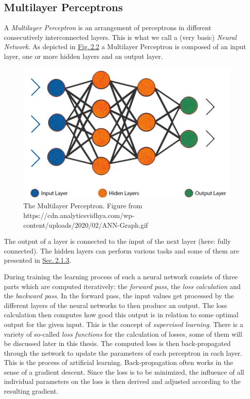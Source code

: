 \subsection{Multilayer Perceptrons} \label{sec:2.1.2}
A \textit{Multilayer Perceptron} is an arrangement of perceptrons in different consecutively interconnected layers. This is what we call a (very basic) \textit{Neural Network}. As depicted in \hyperref[fig:2.2]{Fig.\,2.2} a Multilayer Perceptron is composed of an input layer, one or more hidden layers and an output layer. 
%
\begin{figure} \label{fig:2.2}
    \centering
    \includegraphics[width=.5\textwidth]{Chapters/figures/multilayer_perceptron.PNG}
    \caption[The Multilayer Perceptron]{The Multilayer Perceptron. Figure from\\ https://cdn.analyticsvidhya.com/wp-content/uploads/2020/02/ANN-Graph.gif}
\end{figure}
%
The output of a layer is connected to the input of the next layer (here: fully connected). The hidden layers can perform various tasks and some of them are presented in \hyperref[sec:2.1.3]{Sec.\,2.1.3}.

During training the learning process of such a neural network consists of three parts which are computed iteratively: the \textit{forward pass}, the \textit{loss calculation} and the \textit{backward pass}. In the forward pass, the input values get processed by the different layers of the neural networks to then produce an output. The loss calculation then computes how good this output is in relation to some optimal output for the given input. This is the concept of \textit{supervised learning}. There is a variety of so-called \textit{loss functions} for the calculation of losses, some of them will be discussed later in this thesis. The computed loss is then back-propagated through the network to update the parameters of each perceptron in each layer. This is the process of artificial learning. Back-propagation often works in the sense of a gradient descent. Since the loss is to be minimized, the influence of all individual parameters on the loss is then derived and adjusted according to the resulting gradient. 

